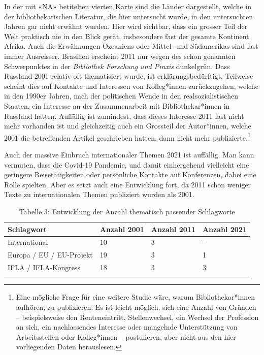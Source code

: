 \documentclass[a4paper,
fontsize=11pt,
oneside,
numbers=noperiodatend,
parskip=half-,
bibliography=totoc,
final
]{scrartcl}
\begin{document}
In der mit «NA» betitelten vierten Karte sind die Länder dargestellt,
welche in der bibliothekarischen Literatur, die hier untersucht wurde,
in den untersuchten Jahren gar nicht erwähnt wurden. Hier wird sichtbar,
dass ein grosser Teil der Welt praktisch nie in den Blick gerät,
insbesondere fast der gesamte Kontinent Afrika. Auch die Erwähnungen
Ozeaniens oder Mittel- und Südamerikas sind fast immer Ausreisser.
Brasilien erscheint 2011 nur wegen des schon genannten Schwerpunktes in
der \emph{Bibliothek Forschung und Praxis} dunkelgrün. Dass Russland
2001 relativ oft thematisiert wurde, ist erklärungsbedürftigt. Teilweise
scheint dies auf Kontakte und Interessen von Kolleg*innen zurückzugehen,
welche in den 1990er Jahren, nach der politischen Wende in den
realsozialistischen Staaten, ein Interesse an der Zusammenarbeit mit
Bibliothekar*innen in Russland hatten. Auffällig ist zumindest, dass
dieses Interesse 2011 fast nicht mehr vorhanden ist und gleichzeitig
auch ein Grossteil der Autor*innen, welche 2001 die betreffenden Artikel
geschrieben hatten, dann nicht mehr publizierte.\footnote{Eine mögliche
  Frage für eine weitere Studie wäre, warum Bibliothekar*innen aufhören,
  zu publizieren. Es ist leicht möglich, sich eine Anzahl von Gründen --
  beispielsweise den Renteneintritt, Stellenwechsel, ein Wechsel der
  Profession an sich, ein nachlassendes Interesse oder mangelnde
  Unterstützung von Arbeitsstellen oder Kolleg*innen -- postulieren,
  aber nicht aus den hier vorliegenden Daten herauslesen.}

Auch der massive Einbruch internationaler Themen 2021 ist auffällig. Man
kann vermuten, dass die Covid-19 Pandemie, und damit einhergehend
vielleicht eine geringere Reisetätigkeiten oder persönliche Kontakte auf
Konferenzen, dabei eine Rolle spielten. Aber es setzt auch eine
Entwicklung fort, da 2011 schon weniger Texte zu internationalen Themen
publiziert wurden als 2001.

\begin{longtable}{llll}
\textbf{Schlagwort}        & \textbf{Anzahl 2001} & \textbf{Anzahl 2011} & \textbf{Anzahl 2021} \\
\hline
International              & 10                   & 3                    & -                    \\
Europa / EU /   EU-Projekt & 19                   & 3                    & 1                    \\
IFLA /   IFLA-Kongress     & 18                   & 3                    & 3                   \\
\caption{Tabelle 3: Entwicklung der Anzahl thematisch passender Schlagworte}\\
\end{longtable}
\end{document}
